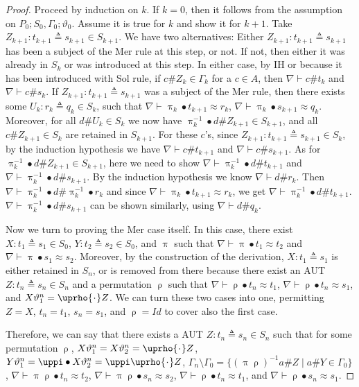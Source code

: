 \documentclass[11pt,a4paper]{amsart}
\theoremstyle{definition}
\newcommand{\id}{\mathit{Id}}
\newcommand{\permap}{{\mkern 1mu\cdot \mkern 1mu}}
\newcommand{\permef}{\bullet}
\newcommand\ppi{\uppi}
\newcommand\prho{\uprho}
\begin{document}
\begin{proof}
Proceed by induction on $k$. If $k=0$, then it follows from the
assumption on $P_0;S_0,\Gamma_0;\vartheta_0$. Assume it is true for
$k$ and show it for $k+1$. Take $Z_{k+1}:t_{k+1}\triangleq s_{k+1} \in
S_{k+1}$. We have two alternatives: Either $Z_{k+1}:t_{k+1}\triangleq
s_{k+1}$ has been a subject of the {\sf Mer} rule at this step, or
not. If not, then either it was already in $S_k$ or was introduced at
this step. In either case, by IH or because it has been
  introduced with {\sf Sol} rule, if $c\#Z_k\in \Gamma_k$ for a $c\in
A$, then $\nabla \vdash c\# t_k$ and $\nabla \vdash c\# s_k$. If
$Z_{k+1}:t_{k+1}\triangleq s_{k+1}$ was a subject of the {\sf Mer}
rule, then there exists some $U_k:r_k \triangleq q_k \in S_k$, such
that $\nabla \vdash \ppi_k\permef t_{k+1} \approx r_k$, $\nabla \vdash
\ppi_k\permef s_{k+1} \approx q_k$. Moreover, for all $d\# U_k \in S_k$ we now have
$\ppi_k^{-1}\permef d \# Z_{k+1} \in S_{k+1}$, and all $c\# Z_{k+1}
\in S_k$ are retained in $S_{k+1}$. For these $c$'s, since
$Z_{k+1}:t_{k+1}\triangleq s_{k+1} \in S_k$, by the induction
hypothesis we have $\nabla \vdash c\# t_{k+1}$ and $\nabla \vdash c\#
s_{k+1}$. As for $\ppi_k^{-1}\permef d \# Z_{k+1} \in S_{k+1}$, here
we need to show $\nabla \vdash \ppi_k^{-1}\permef d \# t_{k+1}$ and
$\nabla \vdash \ppi_k^{-1}\permef d \# s_{k+1}$. By the induction
hypothesis we know $\nabla\vdash d\# r_k$. Then $\nabla\vdash
\ppi_k^{-1}\permef d\# \ppi_k^{-1}\permef r_k$ and since $\nabla
\vdash \ppi_k\permef t_{k+1} \approx r_k$, we get $\nabla \vdash
\ppi_k^{-1}\permef d \# t_{k+1}$. $\nabla \vdash \ppi_k^{-1}\permef d
\# s_{k+1}$ can be shown similarly, using $\nabla\vdash d\# q_k$.

Now we turn to proving the {\sf Mer} case itself. In this case, there exist $X:t_1 \triangleq s_1\in S_0$, $Y:t_2
\triangleq s_2\in S_0$, and $\ppi$ such that $\nabla\vdash \ppi\permef
t_1 \approx t_2$ and $\nabla\vdash \ppi\permef s_1 \approx
s_2$. Moreover, by the construction of the derivation, $X:t_1
\triangleq s_1$ is either retained in $S_n$, or is removed from
there because there exist an AUT $Z:t_n\triangleq s_n\in S_n$ and a
permutation $\prho$ such that $\nabla \vdash \prho \permef t_n \approx
t_1$, $\nabla \vdash \prho \permef t_n \approx s_1$, and
$X\vartheta_1^n = \prho\permap Z $. We can turn these two cases into
one, permitting $Z=X$, $t_n=t_1$, $s_n=s_1$, and $\prho = \id$ to
cover also the first case.



Therefore, we can say that there exists a AUT $Z:t_n\triangleq s_n\in
S_n$ such that for some permutation $\prho$, $X\vartheta_1^n=
X\vartheta_2^n= \prho\permap Z$, $Y\vartheta_1^n= \ppi\permef
X\vartheta_2^n = \ppi \prho \permap Z$, $\Gamma_n\setminus
\Gamma_0=\{(\ppi \prho)^{-1}a\# Z \mid a\# Y\in \Gamma_0\}$,
$\nabla\vdash \ppi \prho \permef t_n\approx t_2$, $\nabla\vdash
\ppi\prho \permef s_n\approx s_2$, $\nabla \vdash \prho
\permef t_n \approx t_1$, and $\nabla \vdash \prho \permef s_n \approx
s_1$.






\end{proof}
\end{document}
